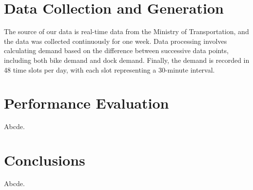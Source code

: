 \documentclass[11pt,a4paper]{article}
\begin{document}
\section{Data Collection and Generation}

The source of our data is real-time data from the Ministry of Transportation, and the data was collected continuously for one week.
Data processing involves calculating demand based on the difference between successive data points, including both bike demand and dock demand.
Finally, the demand is recorded in 48 time slots per day, with each slot representing a 30-minute interval.

\section{Performance Evaluation}

Abcde.

\section{Conclusions}

Abcde.

\vspace{0.5em}
\end{document}
